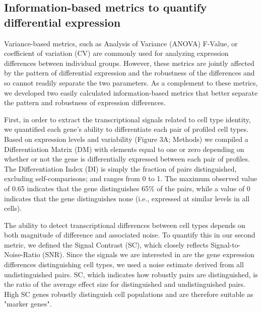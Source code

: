 \subsection{Information-based metrics to quantify differential expression}

Variance-based metrics, such as Analysis of Variance (ANOVA) F-Value, or coefficient of variation (CV) are commonly used for analyzing expression differences between individual groups. However, these metrics are jointly affected by the pattern of differential expression and the robustness of the differences and so cannot readily separate the two parameters. As a complement to these metrics, we developed two easily calculated information-based metrics that better separate the pattern and robustness of expression differences. 

First, in order to extract the transcriptional signals related to cell type identity, we quantified each gene's ability to differentiate each pair of profiled cell types. Based on expression levels and variability (Figure 3A; Methods) we compiled a Differentiation Matrix (DM) with elements equal to one or zero depending on whether or not the gene is differentially expressed between each pair of profiles. The Differentiation Index (DI) is simply the fraction of pairs distinguished, excluding self-comparisons; and ranges from 0 to 1. The maximum observed value of 0.65 indicates that the gene distinguishes 65\% of the pairs, while a value of 0 indicates that the gene distinguishes none (i.e., expressed at similar levels in all cells). 

The ability to detect transcriptional differences between cell types depends on both magnitude of difference and associated noise. To quantify this in our second metric, we defined the Signal Contrast (SC), which closely reflects Signal-to-Noise-Ratio (SNR). Since the signals we are interested in are the gene expression differences distinguishing cell types, we used a noise estimate derived from all undistinguished pairs. SC, which indicates how robustly pairs are distinguished, is the ratio of the average effect size for distinguished and undistinguished pairs. High SC genes robustly distinguish cell populations and are therefore suitable as "marker genes".

